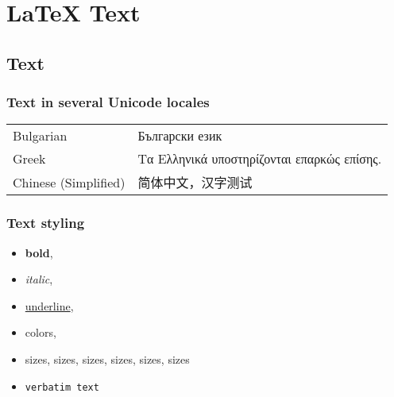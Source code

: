\chapter{LaTeX Text}
\section{Text}
\subsection{Text in several Unicode locales}
\begin{tabular}{ll}
Bulgarian & Български език\\
Greek & Τα Ελληνικά υποστηρίζονται επαρκώς επίσης.\\
Chinese (Simplified) & 简体中文，汉字测试 \\
\end{tabular}

\subsection{Text styling}
\begin{itemize}
\item \textbf{bold},
\item \textit{italic},
\item \underline{underline},
\item {\color{red}c}o{\color{green}l}{\color{brown}o}{\color{blue}r}{\color{orange}s},
\item {\scriptsize sizes}, {\footnotesize sizes}, {\normalsize sizes}, {\large sizes}, {\Large sizes}, {\Huge sizes}
\item \verb|verbatim text|
\end{itemize}